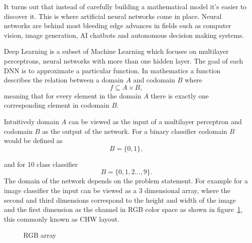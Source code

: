 \documentclass[12pt,a4paper,english
]{tunithesis}
\begin{document}
It turns out that instead of carefully building a mathematical model it's easier to discover it. This is where artificial neural networks come in place. Neural networks are behind most bleeding edge advances in fields such as computer vision, image generation, AI chatbots and autonomous decision making systems.

Deep Learning is a subset of Machine Learning which focuses on multilayer perceptrons, neural networks with more than one hidden layer.
The goal of each DNN is to approximate a particular function.
In mathematics a function describes the relation between a domain $A$ and codomain $B$ where
\begin{equation}
  f \subseteq A \times B,
\end{equation}
meaning that for every element in the domain $A$ there is exactly one corresponding element in codomain $B$.

Intuitively domain $A$ can be viewed as the input of a multilayer perceptron and codomain $B$ as the output of the network. For a binary classifier codomain $B$ would be defined as
\begin{equation}
  B = \{0, 1\},
\end{equation}

and for 10 class classifier
\begin{equation}
  B = \{0, 1, 2 ..., 9\}.
\end{equation}
The domain of the network depends on the problem statement. For example for a image classifier the input can be viewed as a 3 dimensional array, where the second and third dimensions correspond to the height and width of the image and the first dimension as the channel in RGB color space as shown in figure~\ref{fig:rgb-array}, this commonly known as CHW layout.


\begin{figure}
  \centering
  \caption{RGB array}
  \label{fig:rgb-array}
\end{figure}
\end{document}
